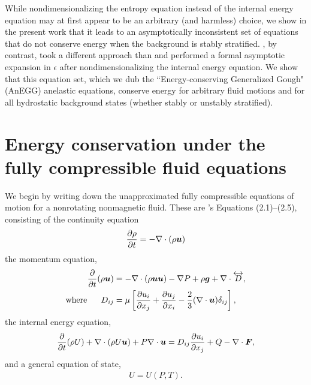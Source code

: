 \documentclass[12pt]{article}
\newcommand{\vecf}{\bm{F}}
\begin{document}
	While nondimensionalizing the entropy equation instead of the internal energy equation may at first appear to be an arbitrary (and harmless) choice, we show in the present work that it leads to an asymptotically inconsistent set of equations that do not conserve energy when the background is stably stratified. \citet{Gough1969}, by contrast, took a different approach than \citet{Ogura1962} and performed a formal asymptotic expansion in $\epsilon$ after nondimensionalizing the internal energy equation. We show that this equation set, which we dub the ``Energy-conserving Generalized Gough" (AnEGG) anelastic equations, conserve energy for arbitrary fluid motions and for all hydrostatic background states (whether stably or unstably stratified).
	
	\section{Energy conservation under the fully compressible fluid equations}\label{sec:fullycompressible}
	We begin by writing down the unapproximated fully compressible equations of motion for a nonrotating nonmagnetic fluid. These are \citet{Gough1969}'s Equations (2.1)--(2.5), consisting of the continuity equation 
	\begin{align}\label{eq:cont}
		\frac{\partial\rho}{\partial t}=-\nabla\cdot(\rho\bm{u}) 
	\end{align}
	the momentum equation,
	\begin{subequations}\label{eq:mom}
	\begin{align}
		\frac{\partial}{\partial t}(\rho\bm{u})&=-\nabla\cdot(\rho\bm{u}\bm{u}) - \nabla P +\rho\bm{g} +\nabla\cdot \overleftrightarrow{D},\label{eq:mommain}\\
		\text{where}\ \ \ \ \  D_{ij}& = \mu\left[\frac{\partial u_i}{\partial x_j} + \frac{\partial u_j}{\partial x_i} - \frac{2}{3}(\nabla\cdot\bm{u})\delta_{ij}\right],\label{eq:momvisc}
	\end{align}
	\end{subequations}
	the internal energy equation,
	\begin{align}\label{eq:en}
		\pderiv{}{t}(\rho U) + \Div(\rho U\vecu) + P\Div\vecu = D_{ij}\pderiv{u_i}{x_j} + Q - \Div\vecf,
	\end{align}
	and a general equation of state,
	\begin{align}\label{eq:eos}
		U = U(P,T).
	\end{align}
\end{document}
